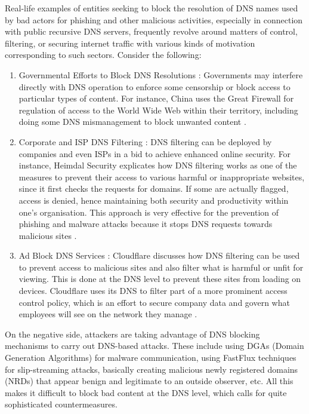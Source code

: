 Real-life examples of entities seeking to block the resolution of DNS names used by bad actors for phishing and other malicious activities, especially in connection with public recursive DNS servers, frequently revolve around matters of control, filtering, or securing internet traffic with various kinds of motivation corresponding to such sectors. Consider the following:

\begin{enumerate}
    \item Governmental Efforts to Block DNS Resolutions : Governments may interfere directly with DNS operation to enforce some censorship or block access to particular types of content. For instance, China uses the Great Firewall for regulation of access to the World Wide Web within their territory, including doing some DNS mismanagement to block unwanted content \cite{XuAlbert2017MediaCensorship}.
    \item Corporate and ISP DNS Filtering : DNS filtering can be deployed by companies and even ISPs in a bid to achieve enhanced online security. For instance, Heimdal Security explicates how DNS filtering works as one of the measures to prevent their access to various harmful or inappropriate websites, since it first checks the requests for domains. If some are actually flagged, access is denied, hence maintaining both security and productivity within one's organisation. This approach is very effective for the prevention of phishing and malware attacks because it stops DNS requests towards malicious sites \cite{
HeimdalDNSSecurity2023}.
    \item Ad Block DNS Services : Cloudflare discusses how DNS filtering can be used to prevent access to malicious sites and also filter what is harmful or unfit for viewing. This is done at the DNS level to prevent these sites from loading on devices. Cloudflare uses its DNS to filter part of a more prominent access control policy, which is an effort to secure company data and govern what employees will see on the network they manage \cite{CloudflareDNSFiltering2023} .   
\end{enumerate}

 On the negative side, attackers are taking advantage of DNS blocking mechanisms to carry out DNS-based attacks. These include using DGAs (Domain Generation Algorithms) for malware communication, using FastFlux techniques for slip-streaming attacks, basically creating malicious newly registered domains (NRDs) that appear benign and legitimate to an outside observer, etc. All this makes it difficult to block bad content at the DNS level, which calls for quite sophisticated countermeasures.



